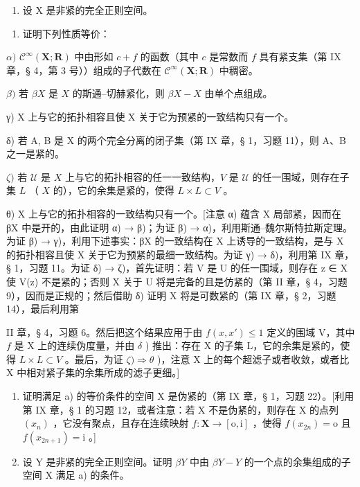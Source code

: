 \begin{enumerate}
\def\labelenumi{\arabic{enumi})}
\setcounter{enumi}{6}
\tightlist
\item
  设 X 是非紧的完全正则空间。
\end{enumerate}

\begin{enumerate}
\def\labelenumi{\alph{enumi})}
\tightlist
\item
  证明下列性质等价：
\end{enumerate}

\(\alpha)\) \(\mathcal{C}^{\infty}(\mathbf{X};\mathbf{R})\) 中由形如 \(c + f\) 的函数（其中 \(c\) 是常数而 \(f\) 具有紧支集（第 IX 章，§ 4，第 3 号））组成的子代数在 \(\mathcal{C}^{\infty}(\mathbf{X};\mathbf{R})\) 中稠密。

\(\beta)\) 若 \(\beta X\) 是 \(X\) 的斯通–切赫紧化，则 \(\beta X - X\) 由单个点组成。

γ) X 上与它的拓扑相容且使 X 关于它为预紧的一致结构只有一个。

δ) 若 A, B 是 X 的两个完全分离的闭子集（第 IX 章，§ 1，习题 11），则 A、B 之一是紧的。

\(\zeta)\) 若 \(\mathcal{U}\) 是 \(X\) 上与它的拓扑相容的任一一致结构，\(V\) 是 \(\mathcal{U}\) 的任一围域，则存在子集 \(L\) （ \(X\) 的），它的余集是紧的，使得 \(L \times L \subset V\) 。

θ) X 上与它的拓扑相容的一致结构只有一个。{[}注意 α) 蕴含 X 局部紧，因而在 βX 中是开的，由此证明 α) → β)；为证 β) → α)，利用斯通–魏尔斯特拉斯定理。为证 β) → γ)，利用下述事实：βX 的一致结构在 X 上诱导的一致结构，是与 X 的拓扑相容且使 X 关于它为预紧的最细一致结构。为证 γ) → δ)，利用第 IX 章，§ 1，习题 11。为证 δ) → ζ)，首先证明：若 V 是 U 的任一围域，则存在 z ∈ X 使 V(z) 不是紧的；否则 X 关于 U 将是完备的且是仿紧的（第 II 章，§ 4，习题 9），因而是正规的；然后借助 δ) 证明 X 将是可数紧的（第 IX 章，§ 2，习题 14），最后利用第

II 章，§ 4，习题 6。然后把这个结果应用于由 \(f(x, x') \leqslant 1\) 定义的围域 V，其中 \(f\) 是 X 上的连续伪度量，并由 \(\delta\) ) 推出：存在 X 的子集 L，它的余集是紧的，使得 \(L \times L \subset V\) 。最后，为证 \(\zeta) \Longrightarrow \theta\) )，注意 X 上的每个超滤子或者收敛，或者比 X 中相对紧子集的余集所成的滤子更细。{]}

\begin{enumerate}
\def\labelenumi{\alph{enumi})}
\setcounter{enumi}{1}
\item
  证明满足 a) 的等价条件的空间 X 是伪紧的（第 IX 章，§ 1，习题 22）。{[}利用第 IX 章，§ 1 的习题 12，或者注意：若 X 不是伪紧的，则存在 X 的点列 \((x_{n})\) ，它没有聚点，且存在连续映射 \(f: \mathbf{X} \to [\mathrm{o}, \mathrm{i}]\) ，使得 \(f(x_{2n}) = \mathrm{o}\) 且 \(f(x_{2n+1}) = \mathrm{i}\) 。{]}
\item
  设 Y 是非紧的完全正则空间。证明 \(\beta Y\) 中由 \(\beta Y - Y\) 的一个点的余集组成的子空间 X 满足 a) 的条件。
\end{enumerate}

